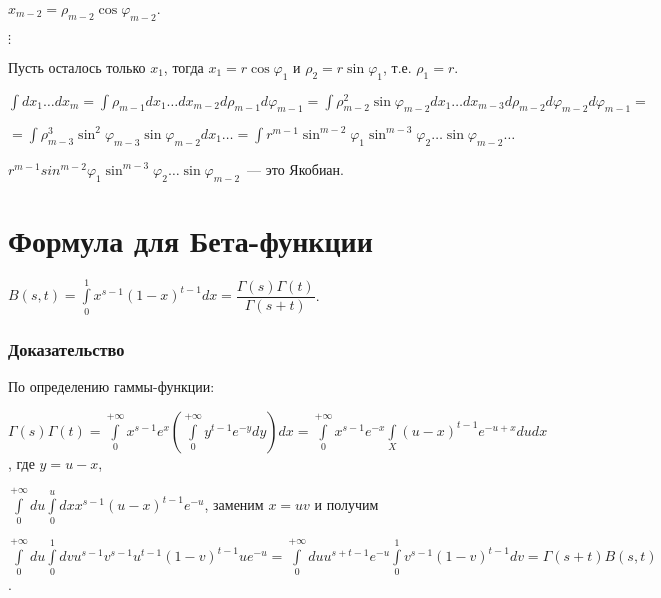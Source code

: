 \documentclass{article}
\begin{document}
        $x_{m - 2} = \rho_{m - 2} \cos \varphi_{m - 2}$.
                    
        $\vdots$
                    
        Пусть осталось только $x_1$, тогда $x_1 = r \cos \varphi_1$ и $\rho_2 = r \sin \varphi_1$, т.е. $\rho_1 = r$.
                    
        $\int dx_1 \ldots dx_m = \int \rho_{m - 1} dx_1 \ldots dx_{m - 2} d\rho_{m - 1} d \varphi_{m - 1} = \int \rho^2_{m - 2} \sin \varphi_{m - 2} dx_1\ldots dx_{m - 3} d \rho_{m - 2} d \varphi_{m - 2} d \varphi_{m - 1} =$
        
        $= \int \rho^3_{m - 3} \sin^2 \varphi_{m - 3} \sin \varphi_{m - 2} dx_1 \ldots = \int r^{m - 1} \sin^{m - 2} \varphi_1 \sin^{m - 3} \varphi_2 \ldots \sin \varphi_{m - 2} \ldots$
                    
        $r^{m - 1} sin^{m - 2} \varphi_1 \sin^{m - 3} \varphi_2 \ldots \sin \varphi_{m - 2}$~--- это Якобиан.
                
    \newpage
    
    \section{Формула для Бета-функции}
    
        $B(s, t) = \int\limits^1_0 x^{s - 1} (1 - x)^{t - 1} dx = \dfrac{\Gamma(s) \Gamma(t)}{\Gamma (s + t)}$.
            
        \subsubsection{Доказательство}
            
            По определению гаммы-функции:
            
            $\Gamma(s) \Gamma(t) = \int\limits^{+\infty}_0 x^{s - 1} e^x \left( \int\limits^{+\infty}_0 y^{t - 1} e^{-y}dy \right) dx = \int\limits^{+\infty}_0 x^{s - 1} e^{-x} \int\limits_X (u - x)^{t - 1} e^{-u + x} du dx$, где $y = u - x$, 
            
            $\int\limits^{+\infty}_0 du \int\limits^u_0 dx x^{s - 1} (u - x)^{t - 1} e^{-u}$, заменим $x = uv$ и получим
            
            $\int\limits^{+\infty}_0 du \int\limits^1_0 dv u^{s - 1} v^{s - 1} u^{t - 1} (1 - v)^{t - 1} u e^{-u} = \int\limits^{+\infty}_0 du u^{s + t - 1} e^{-u} \int\limits^1_0 v^{s - 1}(1 - v)^{t - 1}dv = \Gamma(s + t) B(s, t)$.
       
\end{document}
